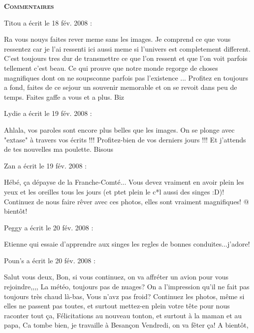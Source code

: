 \bigskip
\textbf{\textsc{Commentaires}}

\medskip
Titou a écrit le 18 fév. 2008 :
\begin{displayquote}
Ra vous nouys faites rever meme sans les images. Je comprend ce que vous ressentez car je l'ai ressenti ici aussi meme si l'univers est completement different. C'est toujours tres dur de transmettre ce que l'on ressent et que l'on voit parfois tellement c'est beau. Ce qui prouve que notre monde regorge de choses magnifiques dont on ne soupsconne parfois pas l'existence ... Profitez en toujours a fond, faites de ce sejour un souvenir memorable et on se revoit dans peu de temps. Faites gaffe a vous et a plus. Biz
\end{displayquote}

\medskip
Lydie a écrit le 19 fév. 2008 :
\begin{displayquote}
Ahlala, vos paroles sont encore plus belles que les images. On se plonge avec "extase" à travers vos écrits !!!
Profitez-bien de vos derniers jours !!! Et j'attends de tes nouvelles ma poulette. Bisous
\end{displayquote}

\medskip
Zan a écrit le 19 fév. 2008 :
\begin{displayquote}
Hébé, ça dépayse de la Franche-Comté...
Vous devez vraiment en avoir plein les yeux et les oreilles tous les jours (et ptet plein le c*l aussi des singes :D)!
Continuez de nous faire rêver avec ces photos, elles sont vraiment magnifiques!
@ bientôt!
\end{displayquote}

\medskip
Peggy a écrit le 20 fév. 2008 :
\begin{displayquote}
Etienne qui essaie d'apprendre aux singes les regles de bonnes conduites...j'adore!
\end{displayquote}

\medskip
Poun's a écrit le 20 fév. 2008 :
\begin{displayquote}
Salut vous deux, Bon, si vous continuez, on va affréter un avion pour vous rejoindre,,,,
La météo, toujours pas de nuages? On a l'impression qu'il ne fait pas toujours très chaud là-bas, Vous n'avz pas froid?
Continuez les photos, même si elles ne passent pas toutes, et surtout mettez-en plein votre tête pour nous raconter tout ça,
Félicitations au nouveau tonton, et surtout à la maman et au papa,
Ca tombe bien, je travaille à Besançon Vendredi, on va fêter ça!
A bientôt,
\end{displayquote}

